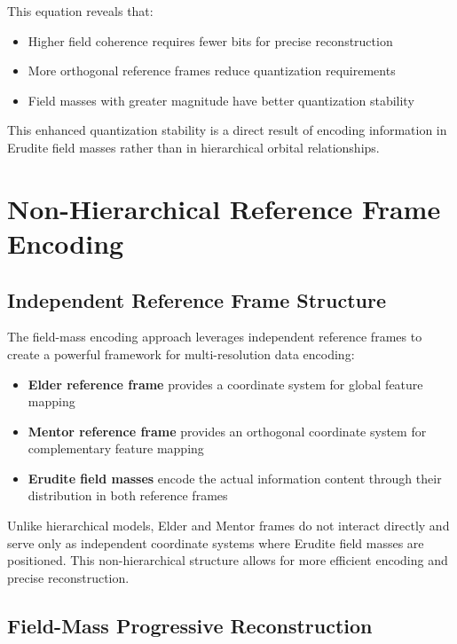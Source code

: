 This equation reveals that:
\begin{itemize}
    \item Higher field coherence requires fewer bits for precise reconstruction
    \item More orthogonal reference frames reduce quantization requirements
    \item Field masses with greater magnitude have better quantization stability
\end{itemize}

This enhanced quantization stability is a direct result of encoding information in Erudite field masses rather than in hierarchical orbital relationships.

\section{Non-Hierarchical Reference Frame Encoding}

\subsection{Independent Reference Frame Structure}

The field-mass encoding approach leverages independent reference frames to create a powerful framework for multi-resolution data encoding:

\begin{itemize}
    \item \textbf{Elder reference frame} provides a coordinate system for global feature mapping
    \item \textbf{Mentor reference frame} provides an orthogonal coordinate system for complementary feature mapping
    \item \textbf{Erudite field masses} encode the actual information content through their distribution in both reference frames
\end{itemize}

Unlike hierarchical models, Elder and Mentor frames do not interact directly and serve only as independent coordinate systems where Erudite field masses are positioned. This non-hierarchical structure allows for more efficient encoding and precise reconstruction.

\subsection{Field-Mass Progressive Reconstruction}

